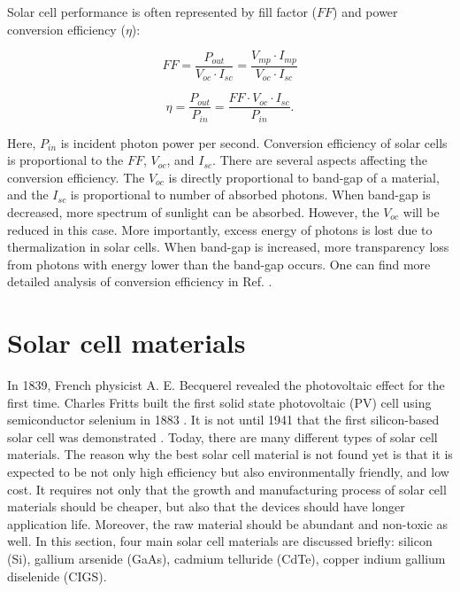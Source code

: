 \documentclass[a4paper, 12pt, titlepage,oneside,drop]{kthesis}
\begin{document}
Solar cell performance is often represented by fill factor ($FF$) and power conversion efficiency ($\eta$):

\begin{equation}
FF = \frac{P_{out}}{V_{oc} \cdot I_{sc}} = \frac{V_{mp} \cdot I_{mp}}{V_{oc} \cdot I_{sc}}
\end{equation}

\begin{equation}
\eta = \frac{P_{out}}{P_{in}} = \frac{FF \cdot V_{oc} \cdot I_{sc}}{P_{in}}.
\end{equation}


Here, $P_{in}$ is incident photon power per second. Conversion efficiency of solar cells is proportional to the $FF$, $V_{oc}$, and $I_{sc}$. There are several aspects affecting
the conversion efficiency. The $V_{oc}$ is directly proportional to band-gap of a material, and the $I_{sc}$ is proportional to number of absorbed photons. When band-gap is decreased, more spectrum of sunlight can be absorbed.
However, the $V_{oc}$ will be reduced in this case. More importantly, excess energy of photons is lost due to thermalization in solar cells. When band-gap is increased, more transparency loss from photons with energy lower than
the band-gap occurs. One can find more detailed analysis of conversion efficiency in Ref. \cite{bok1}.


\section{Solar cell materials}

In 1839, French physicist A. E. Becquerel \cite{Becquerel} revealed the photovoltaic effect for the first time. Charles Fritts built the first solid state photovoltaic (PV) cell using semiconductor selenium in 
1883 \cite{etgar2013semiconductor,gourdin2007solar}. It is not until 1941 that
the first silicon-based solar cell was demonstrated \cite{1941ohl1, 1941ohl2}. Today, there are many different types of solar cell materials. The reason why the best solar cell material is not found yet is that it is expected to be not only high efficiency but 
also environmentally friendly, and low cost. It requires not only that the growth and manufacturing process of solar cell materials should be cheaper, but also that the devices should have longer application life. Moreover, the raw material
should be abundant and non-toxic as well. In this section, four main solar cell materials are discussed briefly: silicon (Si), gallium arsenide (GaAs), cadmium telluride (CdTe), copper indium gallium diselenide (CIGS).
\end{document}
